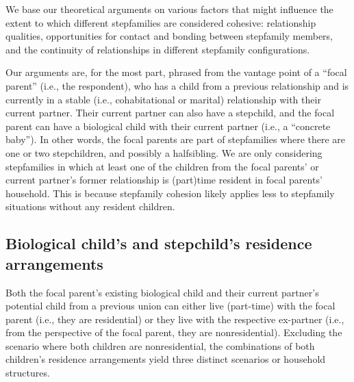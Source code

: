 \documentclass[\pandocDocMode,longtable,floatsintext]{apa6}
\begin{document}
We base our theoretical arguments on various factors that might
influence the extent to which different stepfamilies are considered
cohesive: relationship qualities, opportunities for contact and bonding
between stepfamily members, and the continuity of relationships in
different stepfamily configurations.

Our arguments are, for the most part, phrased from the vantage point of
a ``focal parent'' (i.e., the respondent), who has a child from a
previous relationship and is currently in a stable (i.e., cohabitational
or marital) relationship with their current partner. Their current
partner can also have a stepchild, and the focal parent can have a
biological child with their current partner (i.e., a ``concrete baby'').
In other words, the focal parents are part of stepfamilies where there
are one or two stepchildren, and possibly a halfsibling. We are only
considering stepfamilies in which at least one of the children from the
focal parents' or current partner's former relationship is (part)time
resident in focal parents' household. This is because stepfamily
cohesion likely applies less to stepfamily situations without any
resident children.

\hypertarget{biological-childs-and-stepchilds-residence-arrangements}{%
\subsection{Biological child's and stepchild's residence
arrangements}\label{biological-childs-and-stepchilds-residence-arrangements}}

Both the focal parent's existing biological child and their current
partner's potential child from a previous union can either live
(part-time) with the focal parent (i.e., they are residential) or they
live with the respective ex-partner (i.e., from the perspective of the
focal parent, they are nonresidential). Excluding the scenario where
both children are nonresidential, the combinations of both children's
residence arrangements yield three distinct scenarios or household
structures.
\end{document}
